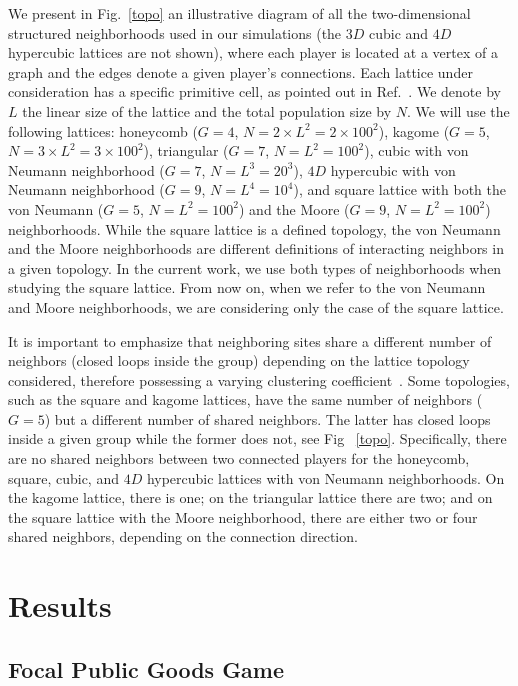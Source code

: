 \documentclass[5p,review]{elsarticle}
\begin{document}
We present in Fig.~\ref{topo} an illustrative diagram of all the two-dimensional structured neighborhoods used in our simulations (the $3D$ cubic and $4D$ hypercubic lattices are not shown), where each player is located at a vertex of a graph and the edges denote a given player's connections.
%
Each lattice under consideration has a specific primitive cell, as pointed out in Ref.~\cite{newmanb99}. 
%
We denote by $L$ the linear size of the lattice and the total population size by $N$. We will use the following lattices: honeycomb ($G=4$, $N = 2 \times L^2=2 \times 100^2$), kagome ($G=5$, $N=3 \times L^2=3 \times 100^2$),  triangular ($G=7$, $N = L^2=100^2$), cubic with von Neumann neighborhood ($G=7$, $N = L^3=20^3$), $4D$ hypercubic with von Neumann neighborhood ($G=9$, $N=L^4=10^4$), and square lattice with both the von Neumann ($G=5$, $N=L^2=100^2$) and the Moore ($G=9$, $N=L^2=100^2$) neighborhoods.
%
While the square lattice is a defined topology, the von Neumann and the Moore neighborhoods are different definitions of interacting neighbors in a given topology. In the current work, we use both types of neighborhoods when studying the square lattice. From now on, when we refer to the von Neumann and Moore neighborhoods, we are considering only the case of the square lattice.


It is important to emphasize that neighboring sites share a different number of neighbors (closed loops inside the group) depending on the lattice topology considered, therefore possessing a varying clustering coefficient~\cite{watts_dj_n98, perc2013evolutionary}. Some topologies, such as the square and kagome lattices, have the same number of neighbors ($G=5$) but a different number of shared neighbors. 
The latter has closed loops inside a given group while the former does not, see Fig ~\ref{topo}.
%
Specifically, there are no shared neighbors between two connected players for the honeycomb, square,   cubic, and $4D$ hypercubic lattices with von Neumann neighborhoods. On the kagome lattice, there is one; on the triangular lattice there are two; and on the square lattice with the Moore neighborhood, there are either two or four shared neighbors, depending on the connection direction.
%

\section{Results} 
\label{Cooperação}
\subsection{Focal Public Goods Game}
\label{sec.FPGG}
\end{document}
